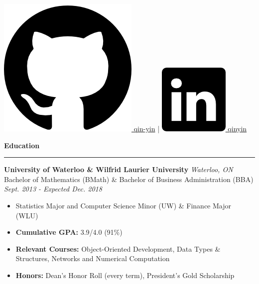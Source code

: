 \documentclass{letter}
\begin{document}
\begin{center}
{			\href{https://github.com/qin-yin}{\includegraphics[scale=0.03]{icons/github.png} \hspace{0pt} qin-yin} \hspace{2pt} | \hspace{2pt} 
			\href{https://linkedin.com/in/qinyin}{\includegraphics[scale=0.055]{icons/linkedin.png} \hspace{1pt} qinyin}}
	\end{center}
	
	 
	\begin{flushleft}
		{\Large \textbf{Education}}
		\rule[5pt]{\textwidth}{0.4pt}
		{\large \textbf{University of Waterloo \& Wilfrid Laurier University}} \hfill \textit{Waterloo, ON}\\
		Bachelor of Mathematics (BMath) \& Bachelor of Business Administration (BBA) \hfill \textit{Sept. 2013 - Expected Dec. 2018}
		\vspace{-9pt}
		\begin{itemize}
			\item Statistics Major and Computer Science Minor (UW) \& Finance Major (WLU) \vspace{-3pt}
			\item \textbf{Cumulative GPA:} 3.9/4.0 (91\%) \vspace{-3pt}
			\item \textbf{Relevant Courses:} Object-Oriented Development, Data Types \& Structures, Networks and Numerical Computation \vspace{-3pt}
			\item \textbf{Honors:} Dean's Honor Roll (every term), President's Gold Scholarship
		\end{itemize}
	\end{flushleft}
	
\end{document}
